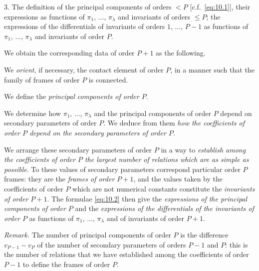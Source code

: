 \documentclass[leqno,11pt]{book}
\numberwithin{equation}{chapter}
\theoremstyle{shape1}
\theoremstyle{shapesmall}
\newcommand{\somespace}{\vspace{9pt}}
\begin{document}
3. The definition of the principal components of orders $<P$ [c.f.~\eqref{eq:10.1}], their expressions as functions of $\pi_{1}$, $\dots$, $\pi_{\lambda}$ and invariants of orders $\le P$; the expressions of the differentials of invariants of orders $1$, $\dots$, $P-1$ as functions of $\pi_{1}$, $\dots$, $\pi_{\lambda}$ and invariants of order $P$.

\somespace

We obtain the corresponding data of order $P+1$ as the following.

We \emph{orient}, if necessary, the contact element of order $P$, in a manner such that the family of frames of order $P$ is connected.

We define the \emph{principal components of order $P$}.

We determine how $\pi_{1}$, $\dots$, $\pi_{\lambda}$ and the principal components of order $P$ depend on secondary parameters of order $P$. We deduce from them \emph{how the coefficients of order $P$ depend on the secondary parameters of order $P$.}

We arrange these secondary parameters of order $P$ in a way to \emph{establish among the coefficients of order $P$ the largest number of relations which are as simple as possible}. To these values of secondary parameters correspond particular order $P$ frames: they are the \emph{frames of order $P+1$}, and the values taken by the coefficients of order $P$ which are not numerical constants constitute the \emph{invariants of order $P+1$}. The formulae \eqref{eq:10.2} then give the \emph{expressions of the principal components of order $P$} and the \emph{expressions of the differentials of the invariants of order $P$} as functions of $\pi_{1}$, $\dots$, $\pi_{\lambda}$ and of invariants of order $P+1$.

\somespace

\emph{Remark.} The number of principal components of order $P$ is the difference $v_{P-1}-v_{P}$ of the number of secondary parameters of orders $P-1$ and $P$: this is the number of relations that we have established among the coefficients of order $P-1$ to define the frames of order $P$.
\end{document}
